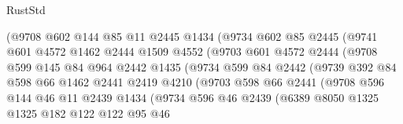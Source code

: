 \begin{lexlean}{RustStd}
\begin{coremodule}
                      (@9708
                        @602
                        @144
                        @85
                        @11
                        @2445
                        @1434
                        (@9734
                          @602
                          @85
                          @2445
                          (@9741
                            @601
                            @4572
                            @1462
                            @2444
                            @1509
                            @4552
                            (@9703
                              @601
                              @4572
                              @2444
                              (@9708
                                @599
                                @145
                                @84
                                @964
                                @2442
                                @1435
                                (@9734
                                  @599
                                  @84
                                  @2442
                                  (@9739
                                    @392
                                    @84
                                    @598
                                    @66
                                    @1462
                                    @2441
                                    @2419
                                    @4210
                                    (@9703
                                      @598
                                      @66
                                      @2441
                                      (@9708
                                        @596
                                        @144
                                        @46
                                        @11
                                        @2439
                                        @1434
                                        (@9734
                                          @596
                                          @46
                                          @2439
                                          (@6389
                                            @8050
                                            @1325
                                            @1325
                                            @182
                                            @122
                                            @122
                                            @95
                                            @46

\end{coremodule}
\end{lexlean}
